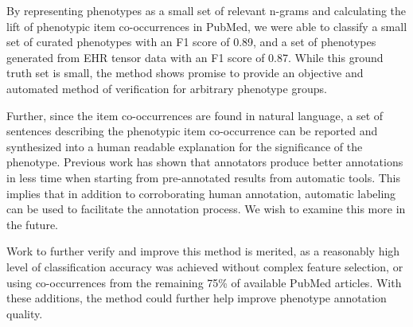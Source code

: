 \documentclass{sig-alternate-05-2015}
\begin{document}
By representing phenotypes as a small set of relevant n-grams and calculating the lift of phenotypic item co-occurrences in PubMed, we were able to classify a small set of curated phenotypes with an F1 score of 0.89, and a set of phenotypes generated from EHR tensor data with an F1 score of 0.87. While this ground truth set is small, the method shows promise to provide an objective and automated method of verification for arbitrary phenotype groups. 

Further, since the item co-occurrences are found in natural language, a set of sentences describing the phenotypic item co-occurrence can be reported and synthesized into a human readable explanation for the significance of the phenotype. 
Previous work \cite{neveol2011semi} has shown that annotators produce better annotations in less time when starting from pre-annotated results from automatic tools. 
This implies that in addition to corroborating human annotation, automatic labeling can be used to facilitate the annotation process. 
We wish to examine this more in the future.

Work to further verify and improve this method is merited, as a reasonably high level of classification accuracy was achieved without complex feature selection, or using co-occurrences from the remaining 75\% of available PubMed articles. With these additions, the method could further help improve phenotype annotation quality. 



%
%
%


\end{document}
